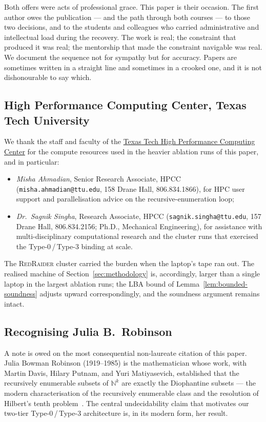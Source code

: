 Both offers were acts of professional grace.  This paper is
their occasion.  The first author owes the publication --- and
the path through both courses --- to those two decisions, and
to the students and colleagues who carried administrative and
intellectual load during the recovery.  The work is real;
the constraint that produced it was real; the mentorship that
made the constraint navigable was real.  We document the
sequence not for sympathy but for accuracy.  Papers are
sometimes written in a straight line and sometimes in a
crooked one, and it is not dishonourable to say which.

\subsection*{High Performance Computing Center, Texas Tech
University}

We thank the staff and faculty of the
\href{https://www.depts.ttu.edu/hpcc/}{Texas Tech High
Performance Computing Center} for the compute resources used in
the heavier ablation runs of this paper, and in particular:

\begin{itemize}
\item \emph{Misha Ahmadian}, Senior Research Associate, HPCC
(\texttt{misha.ahmadian@ttu.edu}, 158 Drane Hall, 806.834.1866),
for HPC user support and parallelisation advice on the
recursive-enumeration loop;
\item \emph{Dr.\ Sagnik Singha}, Research Associate, HPCC
(\texttt{sagnik.singha@ttu.edu}, 157 Drane Hall, 806.834.2156;
Ph.D., Mechanical Engineering), for assistance with
multi-disciplinary computational research and the cluster runs
that exercised the Type-0\,/\,Type-3 binding at scale.
\end{itemize}
The \textsc{RedRaider} cluster carried the burden when the
laptop's tape ran out.  The realised machine of
Section~\ref{sec:methodology} is, accordingly, larger than a
single laptop in the largest ablation runs; the LBA bound of
Lemma~\ref{lem:bounded-soundness} adjusts upward correspondingly,
and the soundness argument remains intact.

\subsection*{Recognising Julia B.\ Robinson}

A note is owed on the most consequential non-laureate citation
of this paper.  Julia Bowman Robinson (1919--1985) is the
mathematician whose work, with Martin Davis, Hilary Putnam, and
Yuri Matiyasevich, established that the recursively enumerable
subsets of $\mathbb{N}^k$ are exactly the Diophantine subsets
--- the modern characterisation of the recursively enumerable
class and the resolution of Hilbert's tenth
problem~\cite{robinson1949definability,davis1961decision}.  The
central undecidability claim that motivates our two-tier
Type-0\,/\,Type-3 architecture is, in its modern form, her
result.

